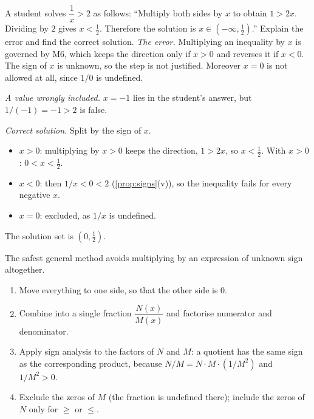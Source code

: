 \begin{example}
A student solves $\dfrac1x>2$ as follows: ``Multiply both sides by $x$ to obtain $1>2x$. Dividing by $2$ gives
$x<\tfrac12$. Therefore the solution is $x\in(-\infty,\tfrac12)$.'' Explain the error and find the correct
solution. 
\solution
\emph{The error.} Multiplying an inequality by $x$ is governed by M6, which keeps the direction only if $x>0$ and
reverses it if $x<0$. The sign of $x$ is unknown, so the step is not justified. Moreover $x=0$ is not allowed at
all, since $1/0$ is undefined.

\emph{A value wrongly included.} $x=-1$ lies in the student's answer, but $1/(-1)=-1>2$ is false.

\emph{Correct solution.} Split by the sign of $x$.
\begin{itemize}
  \item $x>0$: multiplying by $x>0$ keeps the direction, $1>2x$, so $x<\tfrac12$. With $x>0$: $0<x<\tfrac12$.
  \item $x<0$: then $1/x<0<2$ (\cref{prop:signs}(v)), so the inequality fails for every negative $x$.
  \item $x=0$: excluded, as $1/x$ is undefined.
\end{itemize}
The solution set is $(0,\tfrac12)$.
\end{example}

The safest general method avoids multiplying by an expression of unknown sign altogether.

\begin{core}
\begin{enumerate}[label=\arabic*.]
  \item Move everything to one side, so that the other side is $0$.
  \item Combine into a single fraction $\dfrac{N(x)}{M(x)}$ and factorise numerator and denominator.
  \item Apply sign analysis to the factors of $N$ and $M$: a quotient has the same sign as the corresponding
  product, because $N/M=N\cdot M\cdot(1/M^2)$ and $1/M^2>0$.
  \item Exclude the zeros of $M$ (the fraction is undefined there); include the zeros of $N$ only for
  $\ge$ or $\le$.
\end{enumerate}
\end{core}

